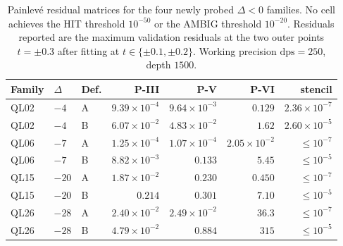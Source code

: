 \documentclass[11pt,reqno]{amsart}
\theoremstyle{definition}
\begin{document}
\begin{table}[h]
\centering
\small
\begin{tabular}{lllrrrr}
\toprule
Family & $\Delta$ & Def. & P-III  & P-V  & P-VI  & stencil \\
\midrule
QL02 & $-4$  & A & $9.39\times 10^{-4}$  & $9.64\times 10^{-3}$ & $0.129$    & $2.36\times 10^{-7}$ \\
QL02 & $-4$  & B & $6.07\times 10^{-2}$  & $4.83\times 10^{-2}$ & $1.62$     & $2.60\times 10^{-5}$ \\
QL06 & $-7$  & A & $1.25\times 10^{-4}$  & $1.07\times 10^{-4}$ & $2.05\times 10^{-2}$  & $\le 10^{-7}$ \\
QL06 & $-7$  & B & $8.82\times 10^{-3}$  & $0.133$    & $5.45$     & $\le 10^{-5}$ \\
QL15 & $-20$ & A & $1.87\times 10^{-2}$  & $0.230$    & $0.450$    & $\le 10^{-7}$ \\
QL15 & $-20$ & B & $0.214$    & $0.301$    & $7.10$     & $\le 10^{-5}$ \\
QL26 & $-28$ & A & $2.40\times 10^{-2}$  & $2.49\times 10^{-2}$ & $36.3$     & $\le 10^{-7}$ \\
QL26 & $-28$ & B & $4.79\times 10^{-2}$  & $0.884$    & $315$      & $\le 10^{-5}$ \\
\bottomrule
\end{tabular}
\caption{Painlev\'e residual matrices for the four newly
probed $\Delta<0$ families. No cell achieves the HIT
threshold $10^{-50}$ or the AMBIG threshold $10^{-20}$.
Residuals reported are the maximum validation residuals at
the two outer points $t=\pm 0.3$ after fitting at
$t\in\{\pm 0.1,\pm 0.2\}$. Working precision
$\mathrm{dps}=250$, depth $1500$.}
\label{tab:full-residuals}
\end{table}
\end{document}
